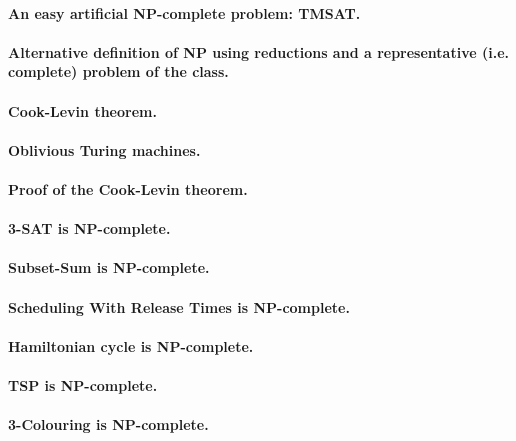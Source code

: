 \documentclass[11pt,a4paper]{article}
\theoremstyle{definition}
\begin{document}
\paragraph{An easy artificial NP-complete problem: TMSAT.}

\paragraph{Alternative definition of NP using reductions and a representative (i.e. complete) problem of the class.}

\paragraph{Cook-Levin theorem.}

\paragraph{Oblivious Turing machines.}

\paragraph{Proof of the Cook-Levin theorem.}

\paragraph{3-SAT is NP-complete.}

\paragraph{Subset-Sum is NP-complete.}

\paragraph{Scheduling With Release Times is NP-complete.}

\paragraph{Hamiltonian cycle is NP-complete.}

\paragraph{TSP is NP-complete.}

\paragraph{3-Colouring is NP-complete.}
\end{document}
